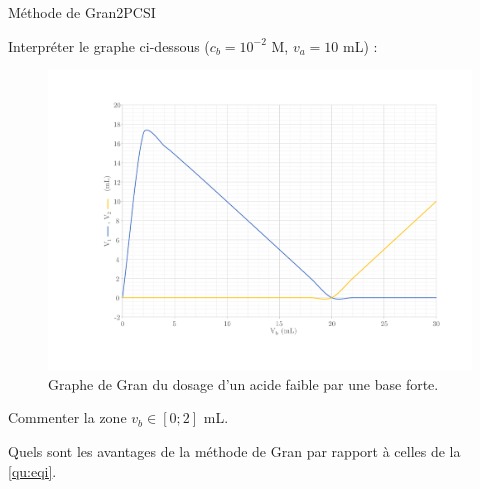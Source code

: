 \begin{exercise}{Méthode de Gran}{2}{PCSI}
\begin{questions}
\question Interpréter le graphe ci-dessous ($c_b = 10^{-2}$ M, $v_a = 10$ mL) : \vspace{-1.2em}

\begin{EnvUplevel}
    \begin{figure}[H]
        \includegraphics[width=\linewidth]{chimie/pH/gran.pdf}
        \caption{Graphe de Gran du dosage d'un acide faible par une base forte.}
    \end{figure}\vspace{-1.2em}
\end{EnvUplevel}

\question Commenter la zone $v_b\in [0 ; 2]$ mL.

\question Quels sont les avantages de la méthode de Gran par rapport à celles de la \ref{qu:eqi}.

\end{questions}
\end{exercise}

